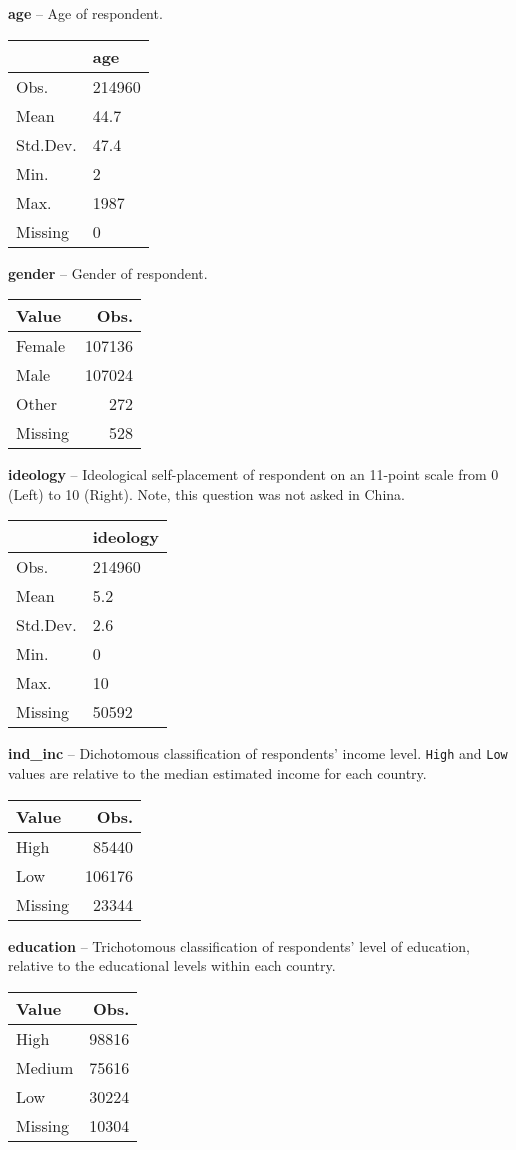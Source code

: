 \documentclass[
]{article}
\begin{document}
\newpage

\textbf{age} -- Age of respondent.

\begin{longtable}[]{@{}ll@{}}
\toprule
& age\tabularnewline
\midrule
\endhead
Obs. & 214960\tabularnewline
Mean & 44.7\tabularnewline
Std.Dev. & 47.4\tabularnewline
Min. & 2\tabularnewline
Max. & 1987\tabularnewline
Missing & 0\tabularnewline
\bottomrule
\end{longtable}

\textbf{gender} -- Gender of respondent.

\begin{longtable}[]{@{}lr@{}}
\toprule
Value & Obs.\tabularnewline
\midrule
\endhead
Female & 107136\tabularnewline
Male & 107024\tabularnewline
Other & 272\tabularnewline
Missing & 528\tabularnewline
\bottomrule
\end{longtable}

\textbf{ideology} -- Ideological self-placement of respondent on an
11-point scale from 0 (Left) to 10 (Right). Note, this question was not
asked in China.

\begin{longtable}[]{@{}ll@{}}
\toprule
& ideology\tabularnewline
\midrule
\endhead
Obs. & 214960\tabularnewline
Mean & 5.2\tabularnewline
Std.Dev. & 2.6\tabularnewline
Min. & 0\tabularnewline
Max. & 10\tabularnewline
Missing & 50592\tabularnewline
\bottomrule
\end{longtable}

\textbf{ind\_inc} -- Dichotomous classification of respondents' income
level. \texttt{High} and \texttt{Low} values are relative to the median
estimated income for each country.

\begin{longtable}[]{@{}lr@{}}
\toprule
Value & Obs.\tabularnewline
\midrule
\endhead
High & 85440\tabularnewline
Low & 106176\tabularnewline
Missing & 23344\tabularnewline
\bottomrule
\end{longtable}

\newpage

\textbf{education} -- Trichotomous classification of respondents' level
of education, relative to the educational levels within each country.

\begin{longtable}[]{@{}lr@{}}
\toprule
Value & Obs.\tabularnewline
\midrule
\endhead
High & 98816\tabularnewline
Medium & 75616\tabularnewline
Low & 30224\tabularnewline
Missing & 10304\tabularnewline
\bottomrule
\end{longtable}
\end{document}
